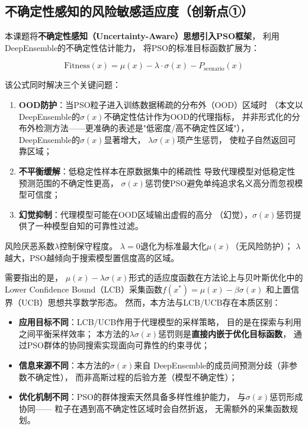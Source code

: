 \subsection{不确定性感知的风险敏感适应度（创新点①）}

本课题将\textbf{不确定性感知（Uncertainty-Aware）思想引入PSO框架}，
利用DeepEnsemble的不确定性估计能力，
将PSO的标准目标函数扩展为：

\begin{equation}
    \text{Fitness}(x) = \mu(x) - \lambda \cdot \sigma(x) - P_{\text{scenario}}(x)
    \label{eq:risk_sensitive}
\end{equation}

该公式同时解决三个关键问题：

\begin{enumerate}
    \item \textbf{OOD防护}：当PSO粒子进入训练数据稀疏的分布外（OOD）区域时
        （本文以DeepEnsemble的$\sigma(x)$不确定性估计作为OOD的代理指标，
        并非形式化的分布外检测方法——更准确的表述是"低密度/高不确定性区域"），
        DeepEnsemble的$\sigma(x)$显著增大，
        $\lambda\sigma(x)$项产生惩罚，
        使粒子自然返回可靠区域；
    \item \textbf{不平衡缓解}：低稳定性样本在原数据集中的稀疏性
        导致代理模型对低稳定性预测范围的不确定性更高，
        $\sigma(x)$惩罚使PSO避免单纯追求名义高分而忽视模型可信度；
    \item \textbf{幻觉抑制}：代理模型可能在OOD区域输出虚假的高分
        （幻觉），$\sigma(x)$惩罚提供了一种模型自知的可靠性过滤。
\end{enumerate}

风险厌恶系数$\lambda$控制保守程度。
$\lambda = 0$退化为标准最大化$\mu(x)$（无风险防护）；
$\lambda$越大，PSO越倾向于搜索模型置信度高的区域。

需要指出的是，
$\mu(x)-\lambda\sigma(x)$形式的适应度函数在方法论上与贝叶斯优化中的
Lower Confidence Bound（LCB）采集函数$f(x^*)=\mu(x)-\beta\sigma(x)$
和上置信界（UCB）思想共享数学形态。
然而，本方法与LCB/UCB存在本质区别：
\begin{itemize}
    \item \textbf{应用目标不同}：LCB/UCB作用于代理模型的采样策略，
        目的是在探索与利用之间平衡采样效率；
        本方法的$\lambda\sigma(x)$惩罚则是\textbf{直接内嵌于优化目标函数}，
        通过PSO群体的协同搜索实现面向可靠性的约束寻优；
    \item \textbf{信息来源不同}：本方法的$\sigma(x)$来自
        DeepEnsemble的成员间预测分歧（非参数不确定性），
        而非高斯过程的后验方差（模型不确定性）；
    \item \textbf{优化机制不同}：PSO的群体搜索天然具备多样性维护能力，
        与$\sigma(x)$惩罚形成协同——
        粒子在遇到高不确定性区域时会自然折返，
        无需额外的采集函数规划。
\end{itemize}

